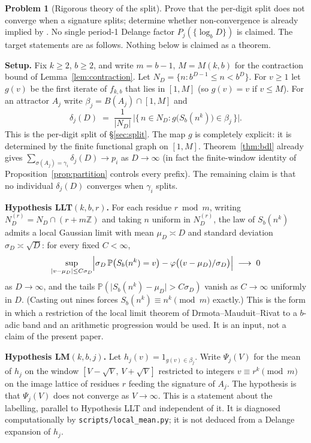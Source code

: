 \documentclass[11pt]{article}
\theoremstyle{definition}
\newtheorem{problem}[theorem]{Problem}
\theoremstyle{remark}
\begin{document}
\begin{problem}[Rigorous theory of the split]\label{prob:split}
Prove that the per-digit split does not converge when a signature splits; determine whether non-convergence is already implied by \cite{delange,drmota-poly,drmota-grabner}. No single period-1 Delange factor $P_j(\{\log_b D\})$ is claimed. The target statements are as follows. Nothing below is claimed as a theorem.

\medskip\noindent\textbf{Setup.} Fix $k\ge 2$, $b\ge 2$, and write $m=b-1$, $M=M(k,b)$ for the contraction bound of Lemma~\ref{lem:contraction}. Let $N_D=\{n: b^{D-1}\le n<b^D\}$. For $v\ge 1$ let $g(v)$ be the first iterate of $f_{k,b}$ that lies in $[1,M]$ (so $g(v)=v$ if $v\le M$). For an attractor $A_j$ write $\beta_j=B(A_j)\cap[1,M]$ and
\[
\delta_j(D)\;=\;\frac1{|N_D|}\,\bigl|\{\,n\in N_D: g\bigl(S_b(n^k)\bigr)\in\beta_j\,\}\bigr|.
\]
This is the per-digit split of \S\ref{sec:split}. The map $g$ is completely explicit: it is determined by the finite functional graph on $[1,M]$. Theorem~\ref{thm:bdl} already gives $\sum_{\sigma(A_j)=\gamma_i}\delta_j(D)\to p_i$ as $D\to\infty$ (in fact the finite-window identity of Proposition~\ref{prop:partition} controls every prefix). The remaining claim is that no individual $\delta_j(D)$ converges when $\gamma_i$ splits.

\medskip\noindent\textbf{Hypothesis LLT$(k,b,r)$.} For each residue $r\bmod m$, writing $N_D^{(r)}=N_D\cap(r+m\mathbb{Z})$ and taking $n$ uniform in $N_D^{(r)}$, the law of $S_b(n^k)$ admits a local Gaussian limit with mean $\mu_D\asymp D$ and standard deviation $\sigma_D\asymp\sqrt{D}$: for every fixed $C<\infty$,
\[
\sup_{\lvert v-\mu_D\rvert\le C\sigma_D}\Bigl\lvert \sigma_D\,\mathbb{P}\bigl(S_b(n^k)=v\bigr)-\varphi\bigl((v-\mu_D)/\sigma_D\bigr)\Bigr\rvert\;\longrightarrow\;0
\]
as $D\to\infty$, and the tails $\mathbb{P}(\lvert S_b(n^k)-\mu_D\rvert>C\sigma_D)$ vanish as $C\to\infty$ uniformly in $D$. (Casting out nines forces $S_b(n^k)\equiv n^k\pmod m$ exactly.) This is the form in which a restriction of the local limit theorem of Drmota--Mauduit--Rivat \cite{dmr} to a $b$-adic band and an arithmetic progression would be used. It is an input, not a claim of the present paper.

\medskip\noindent\textbf{Hypothesis LM$(k,b,j)$.} Let $h_j(v)=1_{g(v)\in\beta_j}$. Write $\Psi_j(V)$ for the mean of $h_j$ on the window $[V-\sqrt{V},\,V+\sqrt{V}]$ restricted to integers $v \equiv r^k \pmod m$ on the image lattice of residues $r$ feeding the signature of $A_j$. The hypothesis is that $\Psi_j(V)$ does not converge as $V\to\infty$. This is a statement about the labelling, parallel to Hypothesis LLT and independent of it. It is diagnosed computationally by \texttt{scripts/local\_mean.py}; it is not deduced from a Delange expansion of $h_j$.


\end{problem}
\end{document}
